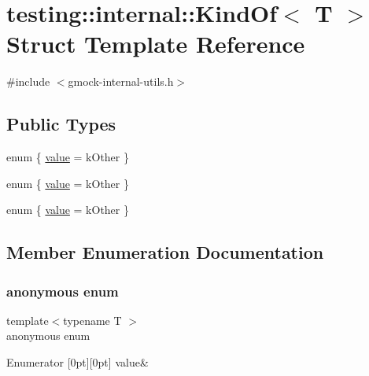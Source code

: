 \hypertarget{structtesting_1_1internal_1_1_kind_of}{}\section{testing\+::internal\+::Kind\+Of$<$ T $>$ Struct Template Reference}
\label{structtesting_1_1internal_1_1_kind_of}


{\ttfamily \#include $<$gmock-\/internal-\/utils.\+h$>$}

\subsection*{Public Types}
\begin{DoxyCompactItemize}
\item 
enum \{ \mbox{\hyperlink{structtesting_1_1internal_1_1_kind_of_a2bad32147d808053ad0a98750cf03c68a3926838d30f6dc80ee770b3baa557bc9}{value}} = k\+Other
 \}
\item 
enum \{ \mbox{\hyperlink{structtesting_1_1internal_1_1_kind_of_a2bad32147d808053ad0a98750cf03c68a3926838d30f6dc80ee770b3baa557bc9}{value}} = k\+Other
 \}
\item 
enum \{ \mbox{\hyperlink{structtesting_1_1internal_1_1_kind_of_a2bad32147d808053ad0a98750cf03c68a3926838d30f6dc80ee770b3baa557bc9}{value}} = k\+Other
 \}
\end{DoxyCompactItemize}


\subsection{Member Enumeration Documentation}
\mbox{\label{structtesting_1_1internal_1_1_kind_of_a4866389a4bc8d5522b5f8ae61a42f520}} 
\subsubsection{\texorpdfstring{anonymous enum}{anonymous enum}}
{\footnotesize\ttfamily template$<$typename T $>$ \\
anonymous enum}

\begin{DoxyEnumFields}{Enumerator}
[0pt][0pt]{}\mbox{\label{structtesting_1_1internal_1_1_kind_of_a2bad32147d808053ad0a98750cf03c68a3926838d30f6dc80ee770b3baa557bc9}} 
value&\\
\hline

\end{DoxyEnumFields}
\mbox{\label{structtesting_1_1internal_1_1_kind_of_a2bad32147d808053ad0a98750cf03c68}} 
